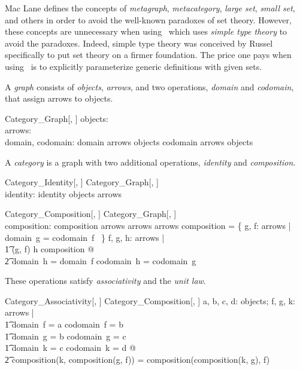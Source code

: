 \documentclass{amsart}
\begin{document}
Mac Lane\cite{maclane-cftwm} defines the concepts of \textit{metagraph}, \textit{metacategory}, \textit{large set},  \textit{small set}, and others 
in order to avoid the well-known paradoxes of set theory.
However, these concepts are unnecessary when using \ZN\ which uses \textit{simple type theory} to avoid the paradoxes.
Indeed, simple type theory was conceived by Russel specifically to put set theory on a firmer foundation.
The price one pays when using \ZN\ is to explicitly parameterize generic definitions with given sets.

A \textit{graph} consists of \textit{objects}, \textit{arrows}, and two operations, \textit{domain} and \textit{codomain}, that assign arrows to objects.
\begin{schema}{Category\_Graph}[\genO, \genA]
	objects: \power \genO \\
	arrows: \power \genA \\
	domain, codomain: \genA \pfun \genO
\where
	domain \in arrows \fun objects
\also
	codomain \in arrows \fun objects
\end{schema}

A \textit{category} is a graph with two additional operations, \textit{identity} and \textit{composition}.
\begin{schema}{Category\_Identity}[\genO, \genA]
	Category\_Graph[\genO, \genA] \\
	identity: \genO \pfun \genA
\where
	identity \in objects \fun arrows
\end{schema}

\begin{schema}{Category\_Composition}[\genO, \genA]
	Category\_Graph[\genO, \genA] \\
	composition: \genA \cross \genA \pfun \genA
\where
	composition \in arrows \cross arrows \pfun arrows
\also
	\dom composition = \{ g, f: arrows | domain~g = codomain~f ~\}
\also
	\forall f, g, h: arrows | \\
	\t1	(g, f) \mapsto h \in composition @ \\
	\t2		domain~h = domain~f \land codomain~h = codomain~g
\end{schema}

These operations satisfy \textit{associativity} and the \textit{unit law}.
\begin{schema}{Category\_Associativity}[\genO, \genA]
	Category\_Composition[\genO, \genA]
\where
	\forall a, b, c, d: objects; f, g, k: arrows | \\
	\t1	domain~f = a \land codomain~f = b \land \\
	\t1	domain~g = b \land codomain~g = c \land \\
	\t1	domain~k = c \land codomain~k = d @\\
	\t2		composition(k, composition(g, f)) = composition(composition(k, g), f)	
\end{schema}
\end{document}
